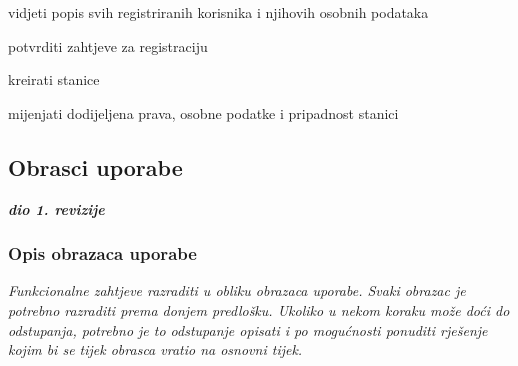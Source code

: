 \begin{packed_enum}
				\begin{packed_enum}
					
					\item vidjeti popis svih registriranih korisnika i njihovih osobnih podataka
					\item potvrditi zahtjeve za registraciju
					\item kreirati stanice
					\item mijenjati dodijeljena prava, osobne podatke i pripadnost stanici
					
				\end{packed_enum}
			\end{packed_enum}
			
			\eject 
			
			
				
			\subsection{Obrasci uporabe}
				
				\textbf{\textit{dio 1. revizije}}
				
				\subsubsection{Opis obrazaca uporabe}
					\textit{Funkcionalne zahtjeve razraditi u obliku obrazaca uporabe. Svaki obrazac je potrebno razraditi prema donjem predlošku. Ukoliko u nekom koraku može doći do odstupanja, potrebno je to odstupanje opisati i po mogućnosti ponuditi rješenje kojim bi se tijek obrasca vratio na osnovni tijek.}\\
					

